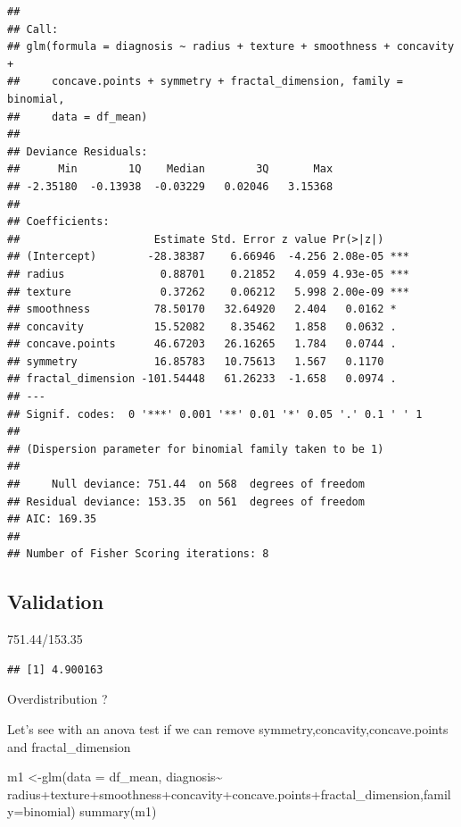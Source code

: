\documentclass[
  11pt,
]{article}
\newenvironment{Shaded}{\begin{snugshade}}{\end{snugshade}}
\newcommand{\AttributeTok}[1]{\textcolor[rgb]{0.77,0.63,0.00}{#1}}
\newcommand{\FloatTok}[1]{\textcolor[rgb]{0.00,0.00,0.81}{#1}}
\newcommand{\FunctionTok}[1]{\textcolor[rgb]{0.00,0.00,0.00}{#1}}
\newcommand{\NormalTok}[1]{#1}
\newcommand{\OtherTok}[1]{\textcolor[rgb]{0.56,0.35,0.01}{#1}}
\newcommand{\SpecialCharTok}[1]{\textcolor[rgb]{0.00,0.00,0.00}{#1}}
\begin{document}
\begin{verbatim}
## 
## Call:
## glm(formula = diagnosis ~ radius + texture + smoothness + concavity + 
##     concave.points + symmetry + fractal_dimension, family = binomial, 
##     data = df_mean)
## 
## Deviance Residuals: 
##      Min        1Q    Median        3Q       Max  
## -2.35180  -0.13938  -0.03229   0.02046   3.15368  
## 
## Coefficients:
##                     Estimate Std. Error z value Pr(>|z|)    
## (Intercept)        -28.38387    6.66946  -4.256 2.08e-05 ***
## radius               0.88701    0.21852   4.059 4.93e-05 ***
## texture              0.37262    0.06212   5.998 2.00e-09 ***
## smoothness          78.50170   32.64920   2.404   0.0162 *  
## concavity           15.52082    8.35462   1.858   0.0632 .  
## concave.points      46.67203   26.16265   1.784   0.0744 .  
## symmetry            16.85783   10.75613   1.567   0.1170    
## fractal_dimension -101.54448   61.26233  -1.658   0.0974 .  
## ---
## Signif. codes:  0 '***' 0.001 '**' 0.01 '*' 0.05 '.' 0.1 ' ' 1
## 
## (Dispersion parameter for binomial family taken to be 1)
## 
##     Null deviance: 751.44  on 568  degrees of freedom
## Residual deviance: 153.35  on 561  degrees of freedom
## AIC: 169.35
## 
## Number of Fisher Scoring iterations: 8
\end{verbatim}

\hypertarget{validation}{%
\subsection{Validation}\label{validation}}

\begin{Shaded}
\begin{Highlighting}[]
\FloatTok{751.44}\SpecialCharTok{/}\FloatTok{153.35}
\end{Highlighting}
\end{Shaded}

\begin{verbatim}
## [1] 4.900163
\end{verbatim}

Overdistribution ?

Let's see with an anova test if we can remove
symmetry,concavity,concave.points and fractal\_dimension

\begin{Shaded}
\begin{Highlighting}[]
\NormalTok{m1 }\OtherTok{\textless{}{-}}\FunctionTok{glm}\NormalTok{(}\AttributeTok{data =}\NormalTok{ df\_mean, diagnosis}\SpecialCharTok{\textasciitilde{}}\NormalTok{ radius}\SpecialCharTok{+}\NormalTok{texture}\SpecialCharTok{+}\NormalTok{smoothness}\SpecialCharTok{+}\NormalTok{concavity}\SpecialCharTok{+}\NormalTok{concave.points}\SpecialCharTok{+}\NormalTok{fractal\_dimension,}\AttributeTok{family=}\NormalTok{binomial)}
\FunctionTok{summary}\NormalTok{(m1)}
\end{Highlighting}
\end{Shaded}
\end{document}
